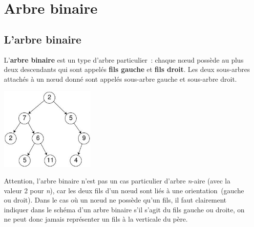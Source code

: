 		


\section{Arbre binaire}

	\subsection{L'arbre binaire}
		
		L'\textbf{arbre binaire} est un type d'arbre particulier~: 
		chaque n{\oe}ud possède au plus deux descendants qui sont
		appelés \textbf{fils gauche} et \textbf{fils droit}. Les 
		deux sous-arbres attachés à un n{\oe}ud donné sont appelés
		sous-arbre gauche et sous-arbre droit.

		\begin{center}
		\includegraphics[width=4.671cm,height=4.129cm]{image/a2012Logique2eme-img033.jpg} 
		\end{center}
		
		Attention, l'arbre binaire n'est pas un cas particulier d'arbre 
		\textit{n}-aire (avec la valeur 2 pour \textit{n}), car les deux fils 
		d'un n{\oe}ud sont liés à une orientation~(gauche ou droit). 
		Dans le cas où un n{\oe}ud ne possède qu'un fils, il faut clairement 
		indiquer dans le schéma d'un arbre binaire s'il s'agit du fils 
		gauche ou droite, on ne peut donc jamais représenter un fils 
		à la verticale du père.

